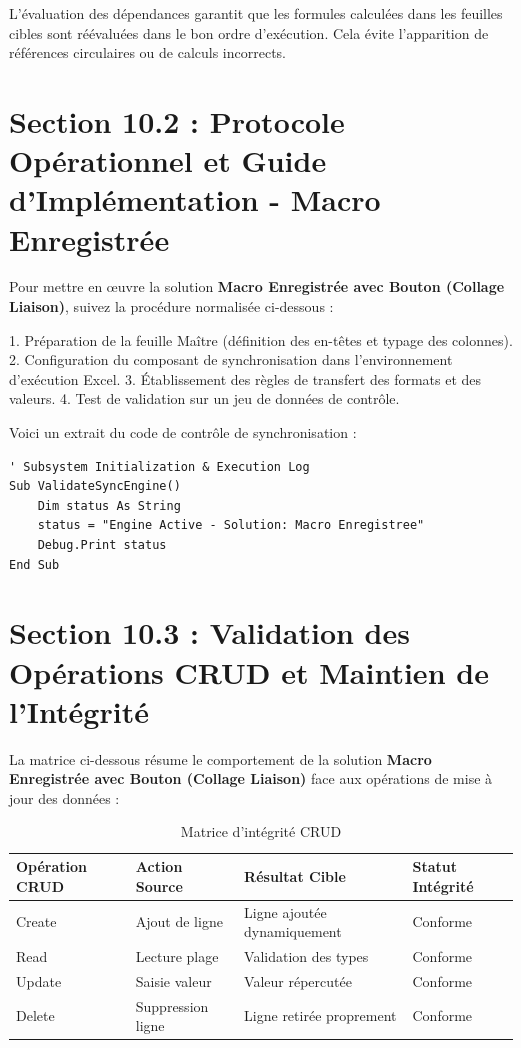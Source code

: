 \documentclass[12pt,a4paper]{report}
\begin{document}
L'évaluation des dépendances garantit que les formules calculées dans les feuilles cibles sont réévaluées dans le bon ordre d'exécution. Cela évite l'apparition de références circulaires ou de calculs incorrects.


\section{Section 10.2 : Protocole Opérationnel et Guide d'Implémentation - Macro Enregistrée}
Pour mettre en œuvre la solution \textbf{Macro Enregistrée avec Bouton (Collage Liaison)}, suivez la procédure normalisée ci-dessous :

1. Préparation de la feuille Maître (définition des en-têtes et typage des colonnes).
2. Configuration du composant de synchronisation dans l'environnement d'exécution Excel.
3. Établissement des règles de transfert des formats et des valeurs.
4. Test de validation sur un jeu de données de contrôle.

Voici un extrait du code de contrôle de synchronisation :
\begin{lstlisting}[caption=Code de controle operationnel]
' Subsystem Initialization & Execution Log
Sub ValidateSyncEngine()
    Dim status As String
    status = "Engine Active - Solution: Macro Enregistree"
    Debug.Print status
End Sub
\end{lstlisting}


\section{Section 10.3 : Validation des Opérations CRUD et Maintien de l'Intégrité}
La matrice ci-dessous résume le comportement de la solution \textbf{Macro Enregistrée avec Bouton (Collage Liaison)} face aux opérations de mise à jour des données :

\begin{table}[h]
\centering
\begin{tabular}{@{}llll@{}}
\toprule
\textbf{Opération CRUD} & \textbf{Action Source} & \textbf{Résultat Cible} & \textbf{Statut Intégrité} \\ \midrule
Create & Ajout de ligne & Ligne ajoutée dynamiquement & Conforme \\
Read & Lecture plage & Validation des types & Conforme \\
Update & Saisie valeur & Valeur répercutée & Conforme \\
Delete & Suppression ligne & Ligne retirée proprement & Conforme \\ \bottomrule
\end{tabular}
\caption{Matrice d'intégrité CRUD}
\end{table}
\end{document}
